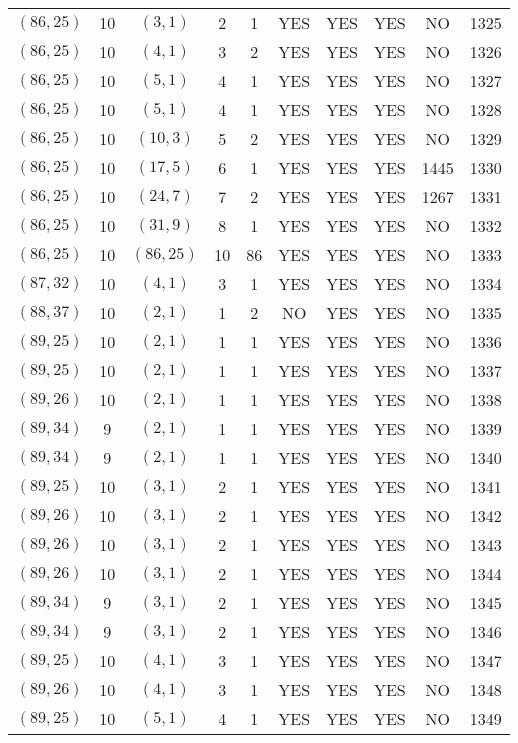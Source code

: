 \begin{longtable}{|c|c|c|c|c|c|c|c|c|c|}
$(86, 25)$ & 10 & $(3, 1)$ & 2 & 1 & YES & YES & YES & NO & 1325\\
$(86, 25)$ & 10 & $(4, 1)$ & 3 & 2 & YES & YES & YES & NO & 1326\\
$(86, 25)$ & 10 & $(5, 1)$ & 4 & 1 & YES & YES & YES & NO & 1327\\
$(86, 25)$ & 10 & $(5, 1)$ & 4 & 1 & YES & YES & YES & NO & 1328\\
$(86, 25)$ & 10 & $(10, 3)$ & 5 & 2 & YES & YES & YES & NO & 1329\\
$(86, 25)$ & 10 & $(17, 5)$ & 6 & 1 & YES & YES & YES & 1445 & 1330\\
$(86, 25)$ & 10 & $(24, 7)$ & 7 & 2 & YES & YES & YES & 1267 & 1331\\
$(86, 25)$ & 10 & $(31, 9)$ & 8 & 1 & YES & YES & YES & NO & 1332\\
$(86, 25)$ & 10 & $(86, 25)$ & 10 & 86 & YES & YES & YES & NO & 1333\\
$(87, 32)$ & 10 & $(4, 1)$ & 3 & 1 & YES & YES & YES & NO & 1334\\
$(88, 37)$ & 10 & $(2, 1)$ & 1 & 2 & NO & YES & YES & NO & 1335\\
$(89, 25)$ & 10 & $(2, 1)$ & 1 & 1 & YES & YES & YES & NO & 1336\\
$(89, 25)$ & 10 & $(2, 1)$ & 1 & 1 & YES & YES & YES & NO & 1337\\
$(89, 26)$ & 10 & $(2, 1)$ & 1 & 1 & YES & YES & YES & NO & 1338\\
$(89, 34)$ & 9 & $(2, 1)$ & 1 & 1 & YES & YES & YES & NO & 1339\\
$(89, 34)$ & 9 & $(2, 1)$ & 1 & 1 & YES & YES & YES & NO & 1340\\
$(89, 25)$ & 10 & $(3, 1)$ & 2 & 1 & YES & YES & YES & NO & 1341\\
$(89, 26)$ & 10 & $(3, 1)$ & 2 & 1 & YES & YES & YES & NO & 1342\\
$(89, 26)$ & 10 & $(3, 1)$ & 2 & 1 & YES & YES & YES & NO & 1343\\
$(89, 26)$ & 10 & $(3, 1)$ & 2 & 1 & YES & YES & YES & NO & 1344\\
$(89, 34)$ & 9 & $(3, 1)$ & 2 & 1 & YES & YES & YES & NO & 1345\\
$(89, 34)$ & 9 & $(3, 1)$ & 2 & 1 & YES & YES & YES & NO & 1346\\
$(89, 25)$ & 10 & $(4, 1)$ & 3 & 1 & YES & YES & YES & NO & 1347\\
$(89, 26)$ & 10 & $(4, 1)$ & 3 & 1 & YES & YES & YES & NO & 1348\\
$(89, 25)$ & 10 & $(5, 1)$ & 4 & 1 & YES & YES & YES & NO & 1349\\

\end{longtable}
